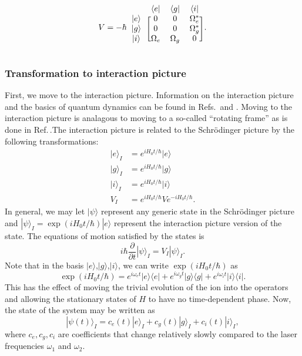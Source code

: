 \begin{equation}
\label{VSchrod2}
V=-\hbar
\begin{blockarray}{cccc}
&\langle e| & \langle g| & \langle i|\\
\begin{block}{c[ccc]}
|e\rangle & 0 & 0 & \Omega_e^*\\
|g\rangle & 0 & 0 & \Omega_g^*\\
|i\rangle & \Omega_e & \Omega_g & 0 \\
\end{block} 
\end{blockarray}.
\end{equation}

\subsubsection{Transformation to interaction picture}
First, we move to the interaction picture.
Information on the interaction picture and the basics of quantum dynamics can be found in Refs.\,\cite{sakurai} and \cite{merzbacher}. Moving to the interaction picture is analagous to moving to a so-called ``rotating frame'' as is done in Ref.\,\cite{Young1997363}.The interaction picture is related to the Schr\"odinger picture by the following transformations: 
\begin{align}
\label{intTransforms}
|e\rangle_I&=e^{iH_0t/\hbar}|e\rangle\\
|g\rangle_I&=e^{iH_0t/\hbar}|g\rangle\\
|i\rangle_I&=e^{iH_0t/\hbar}|i\rangle\\
V_I&=e^{iH_0t/\hbar}Ve^{-iH_0t/\hbar}.
\end{align}
In general, we may let $|\psi\rangle$ represent any generic state in the Schr\"odinger picture and $|\psi\rangle_I=\exp(iH_0t/\hbar)|e\rangle$ represent the interaction picture version of the state. The equations of motion satisfied by the states is 
\begin{equation}
i\hbar \frac{\partial}{\partial t}|\psi\rangle_I= V_I|\psi\rangle_I.
\end{equation}
 Note that in the basis $|e\rangle$,$|g\rangle$,$|i\rangle$, we can write $\exp(iH_0t/\hbar)$ as 
\begin{equation}
\label{expH0}
\exp(iH_0t/\hbar)=e^{i\omega_e t}|e\rangle\langle e|+e^{i\omega_g t}|g\rangle \langle g|+e^{i\omega_i t}|i\rangle\langle i|.
\end{equation}
This has the effect of moving the trivial evolution of the ion into the operators and allowing the stationary states of $H$ to have no time-dependent phase. Now, the state of the system may be written as  
\begin{equation}
|\psi(t)\rangle_I = c_e(t)|e\rangle_I+c_g(t)|g\rangle_I+c_i(t)|i\rangle_I,
\end{equation}
where $c_e,c_g,c_i$ are coefficients that change relatively slowly compared to the laser frequencies $\omega_1$ and $\omega_2$.

